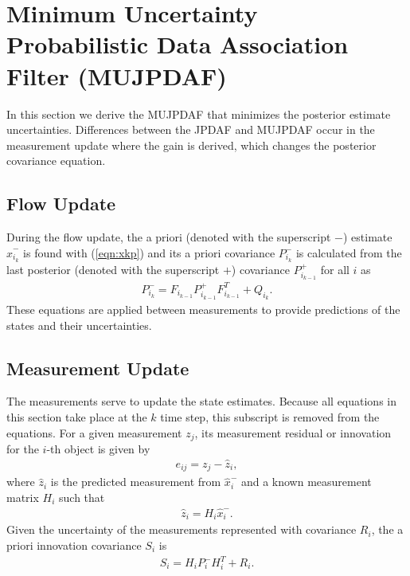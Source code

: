 \documentclass[letterpaper, 10pt, conference]{ieeeconf}
\newcommand{\refeqn}[1]{(\ref{eqn:#1})}
\begin{document}
\section{Minimum Uncertainty Probabilistic Data Association Filter (MUJPDAF)}
\label{MUJPDAF}

In this section we derive the MUJPDAF that minimizes the posterior estimate uncertainties.
Differences between the JPDAF and MUJPDAF occur in the measurement update where the gain is derived, which changes the posterior covariance equation.

\subsection{Flow Update}

During the flow update, the a priori (denoted with the superscript $-$) estimate $\hat x_{i_k}^-$ is found with \refeqn{xkp} and its a priori covariance $P_{i_k}^-$ is calculated from the last posterior (denoted with the superscript $+$) covariance $P_{i_{k-1}}^+$ for all $i$ as
\begin{gather}
P_{i_{k}}^- = F_{i_{k-1}} P_{i_{k-1}}^+ F_{i_{k-1}}^T + Q_{i_{k}}.
\end{gather}
These equations are applied between measurements to provide predictions of the states and their uncertainties.

\subsection{Measurement Update}

The measurements serve to update the state estimates. Because all equations in this section take place at the $k$ time step, this subscript is removed from the equations. For a given measurement $z_j$, its measurement residual or innovation for the $i$-th object is given by
\begin{align}
e_{ij} = z_j - \hat z_i,\label{eqn:eij}
\end{align}
where $\hat z_i$ is the predicted measurement from $\hat x_{i}^-$ and a known measurement matrix $H_i$ such that
\begin{align}
\hat z_i = H_i\hat x_{i}^-.
\end{align}
Given the uncertainty of the measurements represented with covariance $R_i$, the a priori innovation covariance $S_{i}$ is
\begin{align}
S_{i}=H_{i}P_{i}^{-}H_{i}^T+R_{i}.\label{eqn:S}
\end{align}
\end{document}
